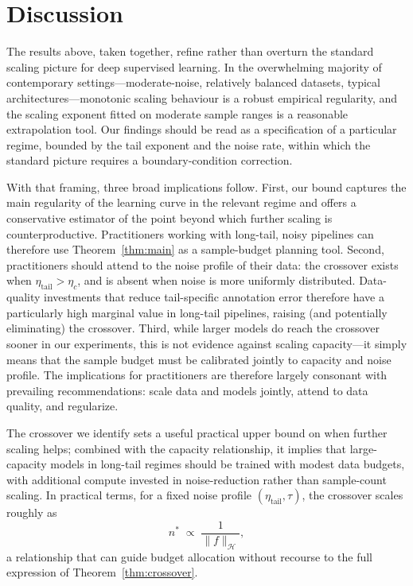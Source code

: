 \documentclass[11pt]{article}
\begin{document}
\section{Discussion} \label{sec:discussion}

The results above, taken together, refine rather than overturn the standard scaling picture for deep supervised learning. In the overwhelming majority of contemporary settings---moderate-noise, relatively balanced datasets, typical architectures---monotonic scaling behaviour is a robust empirical regularity, and the scaling exponent fitted on moderate sample ranges is a reasonable extrapolation tool. Our findings should be read as a specification of a particular regime, bounded by the tail exponent and the noise rate, within which the standard picture requires a boundary-condition correction.

With that framing, three broad implications follow. First, our bound captures the main regularity of the learning curve in the relevant regime and offers a conservative estimator of the point beyond which further scaling is counterproductive. Practitioners working with long-tail, noisy pipelines can therefore use Theorem~\ref{thm:main} as a sample-budget planning tool. Second, practitioners should attend to the noise profile of their data: the crossover exists when $\eta_{\mathrm{tail}} > \eta_c$, and is absent when noise is more uniformly distributed. Data-quality investments that reduce tail-specific annotation error therefore have a particularly high marginal value in long-tail pipelines, raising (and potentially eliminating) the crossover. Third, while larger models do reach the crossover sooner in our experiments, this is not evidence against scaling capacity---it simply means that the sample budget must be calibrated jointly to capacity and noise profile. The implications for practitioners are therefore largely consonant with prevailing recommendations: scale data and models jointly, attend to data quality, and regularize.

The crossover we identify sets a useful practical upper bound on when further scaling helps; combined with the capacity relationship, it implies that large-capacity models in long-tail regimes should be trained with modest data budgets, with additional compute invested in noise-reduction rather than sample-count scaling. In practical terms, for a fixed noise profile $(\eta_{\mathrm{tail}}, \tau)$, the crossover scales roughly as
\begin{equation}
n^{*} \;\propto\; \frac{1}{\|f\|_{\mathcal{H}}}, \label{eq:simple_crossover}
\end{equation}
a relationship that can guide budget allocation without recourse to the full expression of Theorem~\ref{thm:crossover}.
\end{document}
